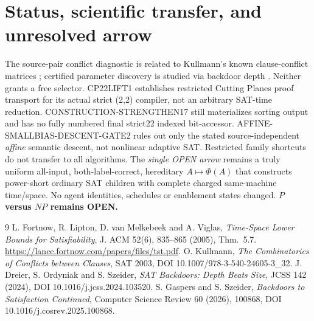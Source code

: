 \documentclass[11pt]{article}
\begin{document}
\section{Status, scientific transfer, and unresolved arrow}
The source-pair conflict diagnostic is related to Kullmann's known clause-conflict matrices \cite{kullmann}; certified parameter discovery is studied via backdoor depth \cite{dos,gs}. Neither grants a free selector. CP22LIFT1 establishes restricted Cutting Planes proof transport for its actual strict (2,2) compiler, not an arbitrary SAT-time reduction. CONSTRUCTION-STRENGTHEN17 still materializes sorting output and has no fully numbered final strict22 indexed bit-accessor. AFFINE-SMALLBIAS-DESCENT-GATE2 rules out only the stated source-independent \emph{affine} semantic descent, not nonlinear adaptive SAT. Restricted family shortcuts do not transfer to all algorithms. The \emph{single OPEN arrow} remains a truly uniform all-input, both-label-correct, hereditary $A\mapsto\Phi(A)$ that constructs power-short ordinary SAT children with complete charged same-machine time/space. No agent identities, schedules or enablement states changed. \textbf{$P$ versus $NP$ remains OPEN.}

\begin{thebibliography}{9}
 L. Fortnow, R. Lipton, D. van Melkebeek and A. Viglas, \emph{Time-Space Lower Bounds for Satisfiability}, J. ACM 52(6), 835--865 (2005), Thm.~5.7. \url{https://lance.fortnow.com/papers/files/tst.pdf}.
 O. Kullmann, \emph{The Combinatorics of Conflicts between Clauses}, SAT 2003, DOI 10.1007/978-3-540-24605-3\_32.
 J. Dreier, S. Ordyniak and S. Szeider, \emph{SAT Backdoors: Depth Beats Size}, JCSS 142 (2024), DOI 10.1016/j.jcss.2024.103520.
 S. Gaspers and S. Szeider, \emph{Backdoors to Satisfaction Continued}, Computer Science Review 60 (2026), 100868, DOI 10.1016/j.cosrev.2025.100868.
\end{thebibliography}
\end{document}
